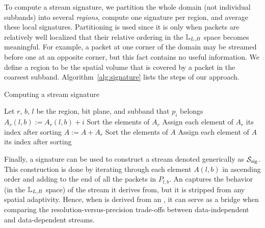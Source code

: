 To compute a stream signature, we partition the whole domain (not individual subbands) into several
\emph{regions}, compute one signature per region, and average these local signatures. Partitioning
is used since it is only when packets are relatively well localized that their relative ordering in
the ${\mathbb L}_{L,B}$ space becomes meaningful. For example, a packet at one corner of the domain may
be streamed before one at an opposite corner, but this fact contains no useful information. We
define a region to be the spatial volume that is covered by a packet in the coarsest subband.
Algorithm~\ref{alg:signature} lists the steps of our approach.

\vspace{-0.5em}
\begin{algorithm}[h]
  \caption{Computing a stream signature}
  \begin{algorithmic}[1]
			\State Let $r$, $b$, $l$ be the region, bit plane, and subband that $p_i$ belongs
			\State $A_r(l,b) := A_r(l,b)+i$
		\EndFor
			\State Sort the elements of $A_r$
			\State Assign each element of $A_r$ its index after sorting
			\State $A := A+A_r$
		\EndFor
		\State Sort the elements of $A$
		\State Assign each element of $A$ its index after sorting
	\end{algorithmic}
	\label{alg:signature}
\end{algorithm}
\vspace{-0.5em}

Finally, a signature can be used to construct a stream denoted generically as $\ssig$. This
construction is done by iterating through each element $A(l,b)$ in ascending order and adding to the
end of \ssig all the packets in $P_{l,b}$. An \ssig captures the behavior (in the ${\mathbb L}_{L,B}$
space) of the stream it derives from, but it is stripped from any spatial adaptivity. Hence, when
\ssig is derived from an \sopt, it can serve as a bridge when comparing the
resolution-versus-precision trade-offs between data-independent and data-dependent streams.